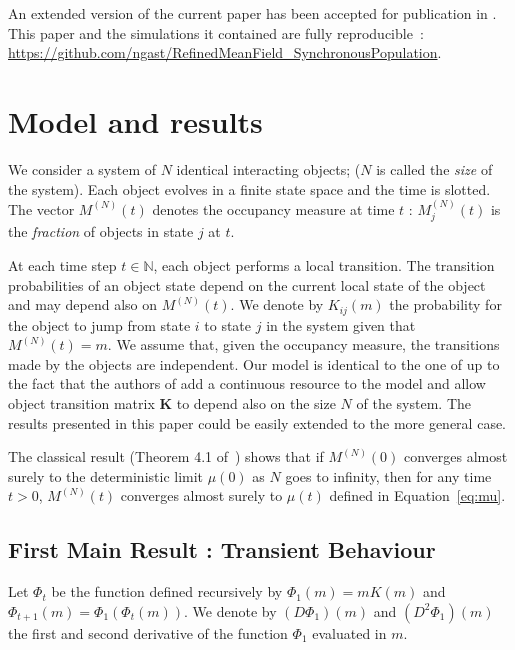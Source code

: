 \documentclass{sig-alternate-per}
\newcommand{\vr}[1]{\mathbf{#1}}
\newcommand\MN{M^{(N)}}
\newcommand\N{\mathbb{N}}
\newcommand{\aN}{^{(N)}}
\begin{document}
An extended version of the current paper has been accepted for
publication in \cite{GaLaMa17}. This paper and the simulations it
contained are fully reproducible~:
{\footnotesize\url{https://github.com/ngast/RefinedMeanField_SynchronousPopulation}}.

\section{Model and results}
\label{sec:model}



We consider a system of $N$ identical interacting objects; ($N$ is
called the {\em size} of the system).  Each object evolves in a finite
state space and the time is slotted. The vector $\MN(t)$ denotes the
occupancy measure at time $t$ : $\MN_j(t)$ is the {\em fraction} of
objects in state $j$ at $t$.

At each time step $t \in \N$, each object performs a local
transition. The transition probabilities of an object state depend on
the current local state of the object and may depend also on
$\MN(t)$. We denote by $K_{ij}(m)$ the probability for the object to
jump from state $i$ to state $j$ in the system given that $\MN(t)=m$.
We assume that, given the occupancy measure, the transitions made by
the objects are independent. Our model is identical to the one of
\cite{Le+07} up to the fact that the authors of \cite{Le+07} add a
continuous resource to the model and allow object transition matrix
$\vr{K}$ to depend also on the size $N$ of the system.  The results
presented in this paper could be easily extended to the more general
case.

The classical result (Theorem 4.1 of~\cite{Le+07}) shows that if
$M\aN(0)$ converges almost surely to the deterministic limit $\mu(0)$
as $N$ goes to infinity, then for any time $t>0$, $M\aN(t)$ converges
almost surely to $\mu(t)$ defined in Equation~\eqref{eq:mu}.


\subsection{First Main Result : Transient Behaviour}

Let $\Phi_t$ be the function defined recursively by $\Phi_1(m)=mK(m)$
and $\Phi_{t+1}(m)=\Phi_1(\Phi_t(m))$. We denote by $(D\Phi_1)(m)$ and
$(D^2\Phi_1)(m)$ the first and second derivative of the function
$\Phi_1$ evaluated in $m$.
\end{document}
